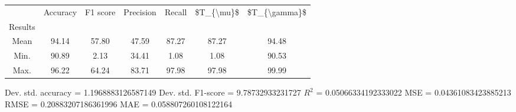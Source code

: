 \begin{tabular}{|c|c|c|c|c|c|c|}
\toprule
{} &  Accuracy &  F1 score &  Precision &  Recall &  \$T\_\{\textbackslash mu\}\$ &  \$T\_\{\textbackslash gamma\}\$ \\
Results &           &           &            &         &            &               \\
\hline
Mean    &     94.14 &     57.80 &      47.59 &   87.27 &      87.27 &         94.48 \\
Min.    &     90.89 &      2.13 &      34.41 &    1.08 &       1.08 &         90.53 \\
Max.    &     96.22 &     64.24 &      83.71 &   97.98 &      97.98 &         99.99 \\
\bottomrule
\end{tabular}

 Dev. std. accuracy = 1.1968883126587149
 Dev. std. F1-score = 9.78732933231727
 $R^2$ = 0.05066334192333022
 MSE = 0.04361083423885213
 RMSE = 0.20883207186361996
 MAE = 0.058807260108122164